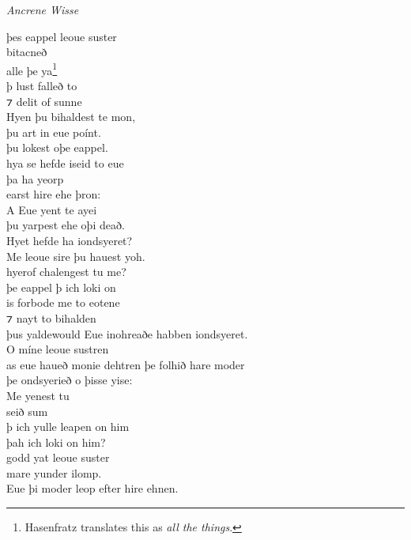 \begin{texts}{\textit{Ancrene Wisse}}
\begin{textglossed}
þes eappel leoue suster\\
bitacneð\\
alle þe ya\footnote{Hasenfratz translates this as \textit{all the things}.}\\
þ lust falleð to\\
⁊ delit of sunne\\
Hyen þu bihaldest te mon,\\
þu art in eue poínt.\\
þu lokest oþe eappel.\\
hya se hefde iseid to eue\\
þa ha yeorp\\
earst hire ehe þron:\\
A Eue yent te ayei\\
þu yarpest ehe oþi deað.\\
Hyet hefde ha iondsyeret?\\
Me leoue sire þu hauest yoh.\\
hyerof chalengest tu me?\\
þe eappel þ ich loki on\\
is forbode me to eotene\\
⁊ nayt to bihalden\\
þus yalde{would} Eue inohreaðe habben iondsyeret.\\
O míne leoue sustren\\
as eue haueð monie dehtren þe folhið hare moder\\
þe ondsyerieð o þisse yise:\\
Me yenest tu\\
seið sum\\
þ ich yulle leapen on him\\
þah ich loki on him?\\
godd yat leoue suster\\
mare yunder ilomp.\\
Eue þi moder leop efter hire ehnen.\\

\end{textglossed}
\end{texts}
